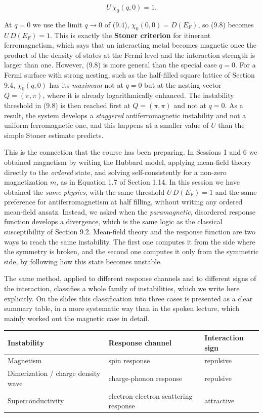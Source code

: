 \begin{equation}
U\, \chi_0(q,0) = 1.
\end{equation}

At $q=0$ we use the limit $q\to0$ of (9.4), $\chi_0(0,0) = D(E_F)$, so (9.8) becomes
$U\,D(E_F) = 1$. This is exactly the \textbf{Stoner criterion} for itinerant ferromagnetism, which
says that an interacting metal becomes magnetic once the product of the density of states at the
Fermi level and the interaction strength is larger than one. However, (9.8) is more general than the
special case $q=0$. For a Fermi surface with strong nesting, such as the half-filled square lattice
of Section 9.4, $\chi_0(q,0)$ has its \emph{maximum} not at $q=0$ but at the nesting vector
$Q=(\pi,\pi)$, where it is already logarithmically enhanced. The instability threshold in (9.8) is
then reached first at $Q=(\pi,\pi)$ and not at $q=0$. As a result, the system develops a
\emph{staggered} antiferromagnetic instability and not a uniform ferromagnetic one, and this happens
at a smaller value of $U$ than the simple Stoner estimate predicts.

This is the connection that the course has been preparing. In Sessions 1 and 6 we obtained magnetism by writing the Hubbard model, applying mean-field
theory directly to the \emph{ordered} state, and solving self-consistently for a non-zero
magnetization $m$, as in Equation 1.7 of Section 1.14. In this session we have obtained the
\emph{same physics}, with the same threshold $U\,D(E_F)=1$ and the same preference for
antiferromagnetism at half filling, without writing any ordered mean-field ansatz. Instead, we asked
when the \emph{paramagnetic}, disordered response function develops a divergence, which is the same
logic as the classical susceptibility of Section 9.2. Mean-field theory and the response function
are two ways to reach the same instability. The first one computes it from the side where the
symmetry is broken, and the second one computes it only from the symmetric side, by following how
this state becomes unstable.

The same method, applied to different response channels and to different signs of the interaction,
classifies a whole family of instabilities, which we write here explicitly. On the slides this
classification into three cases is presented as a clear summary table, in a more systematic way than
in the spoken lecture, which mainly worked out the magnetic case in detail.

\begin{center}
\begin{tabular}{lll}
\hline
Instability & Response channel & Interaction sign \\
\hline
Magnetism & spin response & repulsive \\
Dimerization / charge density wave & charge-phonon response & repulsive \\
Superconductivity & electron-electron scattering response & attractive \\
\hline
\end{tabular}
\end{center}

